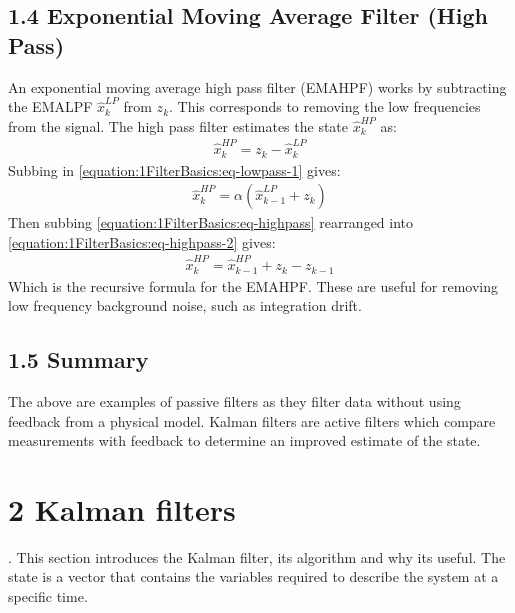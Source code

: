 \documentclass[letterpaper,10pt,english]{jupyterBook}
\begin{document}
\section{1.4 Exponential Moving Average Filter (High Pass)}
\label{\detokenize{1FilterBasics:exponential-moving-average-filter-high-pass}}
\sphinxAtStartPar
An exponential moving average high pass filter (EMAHPF) works by subtracting the EMALPF \(\hat{x}^{LP}_k\) from \(z_k\). This corresponds to removing the low frequencies from the signal. The high pass filter estimates the state \(\hat{x}^{HP}_k\) as:
\begin{equation}\label{equation:1FilterBasics:eq-highpass}
\begin{split}\hat{x}_k^{HP} = z_k - \hat{x}^{LP}_k \end{split}
\end{equation}
\sphinxAtStartPar
Subbing in \eqref{equation:1FilterBasics:eq-lowpass-1} gives:
\begin{equation}\label{equation:1FilterBasics:eq-highpass-2}
\begin{split}\hat{x}_k^{HP} = \alpha (\hat{x}^{LP}_{k-1} + z_k)\end{split}
\end{equation}
\sphinxAtStartPar
Then subbing \eqref{equation:1FilterBasics:eq-highpass} rearranged into \eqref{equation:1FilterBasics:eq-highpass-2} gives:
\begin{equation}\label{equation:1FilterBasics:eq-highpass-3}
\begin{split}\hat{x}_k^{HP} = \hat{x}_{k-1}^{HP} + z_k - z_{k-1}\end{split}
\end{equation}
\sphinxAtStartPar
Which is the recursive formula for the EMAHPF. These are useful for removing low frequency background noise, such as integration drift.


\section{1.5 Summary}
\label{\detokenize{1FilterBasics:summary}}
\sphinxAtStartPar
The above are examples of passive filters as they filter data without using feedback from a physical model. Kalman filters are active filters which compare measurements with feedback to determine an improved estimate of the state.

\sphinxstepscope


\chapter{2 Kalman filters}
\label{\detokenize{2KalmanFilters:kalman-filters}}\label{\detokenize{2KalmanFilters::doc}}
\sphinxAtStartPar
{}. This section introduces the Kalman filter, its algorithm and why its useful. The state is a vector that contains the variables required to describe the system at a specific time.
\end{document}
